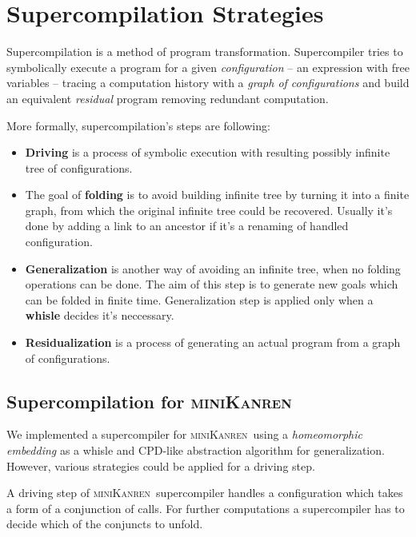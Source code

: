 \documentclass[submission,copyright,creativecommons]{eptcs}
\newcommand{\miniKanren}{\textsc{miniKanren}\ }
\begin{document}
\section{Supercompilation Strategies}

Supercompilation is a method of program transformation. Supercompiler tries to symbolically
execute a program for a given {\it configuration} -- an expression with free variables --
tracing a computation history with a {\it graph of configurations} and build an equivalent {\it residual} program removing redundant computation.

More formally, supercompilation's steps are following:
\begin{itemize}
\item {\bf Driving} is a process of symbolic execution with resulting possibly infinite tree of configurations.
\item The goal of {\bf folding} is to avoid building infinite tree by turning it into a finite graph, from which
      the original infinite tree could be recovered. Usually it's done by adding a link to an ancestor if it's a
      renaming of handled configuration.

\item {\bf Generalization} is another way of avoiding an infinite tree, when no folding operations can be done.
     The aim of this step is to generate new goals which can be folded in finite time. Generalization step is applied
     only when a {\bf whisle} decides it's neccessary.

\item {\bf Residualization} is a process of generating an actual program from a graph of configurations.
\end{itemize}

\subsection{Supercompilation for \miniKanren}

We implemented a supercompiler for \miniKanren using a {\it homeomorphic embedding} as a whisle and CPD-like abstraction algorithm
for generalization. However, various strategies could be applied for a driving step.

A driving step of \miniKanren supercompiler handles a configuration which takes a form of a conjunction of calls.
For further computations a supercompiler has to decide which of the conjuncts to unfold.
\end{document}
